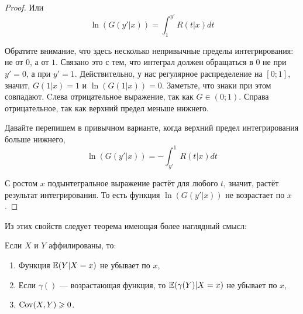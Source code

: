 \begin{proof}
Или
\begin{equation}
\ln(G(y'|x))=\int_{1}^{y'}R(t|x)dt
\end{equation}

Обратите внимание, что здесь несколько непривычные пределы интегрирования: не от $0$, а от $ 1 $. Связано это с тем, что интеграл должен обращаться в 0 не при $ y'=0 $, а при $ y'=1 $. Действительно, у нас регулярное распределение на $ [0;1] $, значит, $ G(1|x)=1 $ и $ \ln (G(1|x))=0 $. Заметьте, что знаки при этом совпадают. Cлева отрицательное выражение, так как $ G\in (0;1) $. Справа отрицательное, так как верхний предел меньше нижнего.

Давайте перепишем в привычном варианте, когда верхний предел интегрирования больше нижнего,
\begin{equation}
\ln(G(y'|x))=-\int_{y'}^{1}R(t|x)dt
\end{equation}

С ростом $ x $ подынтегральное выражение растёт для любого $ t $, значит, растёт результат интегрирования. То есть функция $\ln( G(y'|x) )$ не возрастает по $ x $.

\end{proof}









Из этих свойств следует теорема имеющая более наглядный смысл:
\begin{myth} \label{prop_affiliated}
Если $ X $ и $ Y $ аффилированы, то: 
\begin{enumerate}
\item Функция $ \operatorname{\mathbb{E}}(Y|X=x )$ не убывает по $ x $,
\item Если $ \gamma() $ — возрастающая функция, то $ \operatorname{\mathbb{E}}(\gamma(Y)|X=x) $ не убывает по $ x $,
\item $\operatorname{Cov}(X,Y)\geqslant 0 $.
\end{enumerate}
\end{myth}




